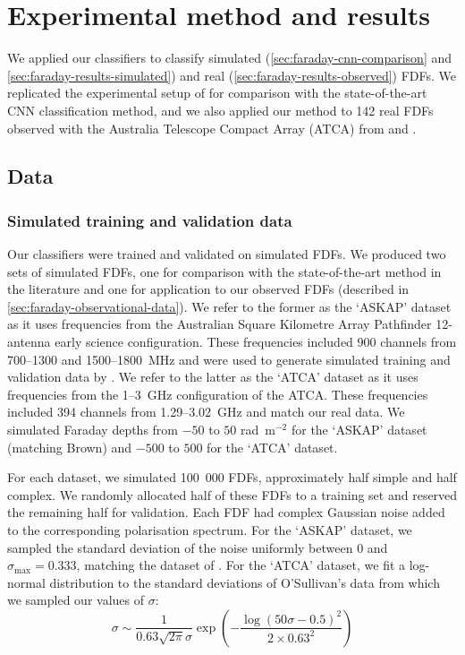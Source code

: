 \documentclass[11pt, a4paper]{book}
\begin{document}
\section{Experimental method and results}
\label{sec:faraday-experiment-classification}

  We applied our classifiers to classify simulated (\autoref{sec:faraday-cnn-comparison} and \ref{sec:faraday-results-simulated}) and real (\autoref{sec:faraday-results-observed}) FDFs. We replicated the experimental setup of \citet{brown_classifying_2018} for comparison with the state-of-the-art CNN classification method, and we also applied our method to 142 real FDFs observed with the Australia Telescope Compact Array (ATCA) from \citet{livingston21faraday} and \citet{osullivan_broad-band_2017}.

  \subsection{Data}

  \subsubsection{Simulated training and validation data}
  \label{sec:faraday-simulated-training-data}

    Our classifiers were trained and validated on simulated FDFs. We produced two sets of simulated FDFs, one for comparison with the state-of-the-art method in the literature and one for application to our observed FDFs (described in \autoref{sec:faraday-observational-data}). We refer to the former as the `ASKAP' dataset as it uses frequencies from the Australian Square Kilometre Array Pathfinder 12-antenna early science configuration. These frequencies included 900 channels from 700--1300 and 1500--1800~MHz and were used to generate simulated training and validation data by \citet{brown_classifying_2018}. We refer to the latter as the `ATCA' dataset as it uses frequencies from the 1--3~GHz configuration of the ATCA. These frequencies included 394 channels from 1.29--3.02~GHz and match our real data. We simulated Faraday depths from $-50$ to $50$ rad~m$^{-2}$ for the `ASKAP' dataset (matching Brown) and $-500$ to $500$ for the `ATCA' dataset.

    For each dataset, we simulated 100~000 FDFs, approximately half simple and half complex. We randomly allocated half of these FDFs to a training set and reserved the remaining half for validation. Each FDF had complex Gaussian noise added to the corresponding polarisation spectrum. For the `ASKAP' dataset, we sampled the standard deviation of the noise uniformly between 0 and $\sigma_{\max} = 0.333$, matching the dataset of \citet{brown_classifying_2018}.
    For the `ATCA' dataset, we fit a log-normal distribution to the standard deviations of O'Sullivan's data \citep{osullivan_broad-band_2017} from which we sampled our values of $\sigma$:
    \begin{equation}
      \sigma \sim \frac{1}{0.63 \sqrt{2 \pi} \sigma} \exp \left(-\frac{\log\left(50 \sigma - 0.5\right)^2}{2 \times 0.63^2}\right)
    \end{equation}
\end{document}
